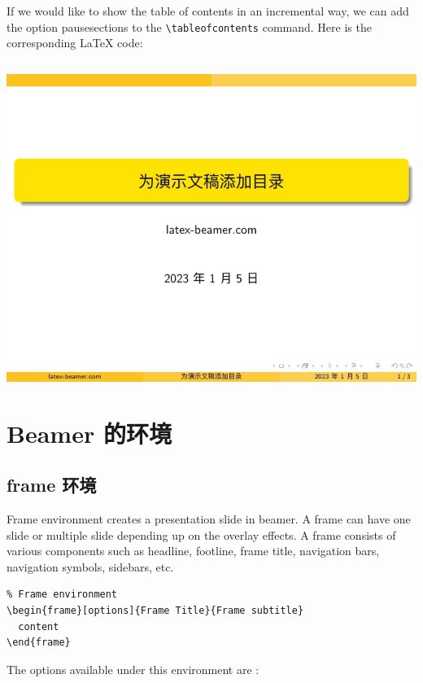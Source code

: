 If we would like to show the table of contents in an incremental way, we can add the option {\ttfamily pausesections} to the \verb|\tableofcontents| command. Here is the corresponding {\LaTeX} code:

\inputminted[linenos=true]{latex}{examples/beamer/beamertoc04.tex}

\includegraphics[page=2]{examples/beamer/beamertoc04.pdf}

\section{Beamer 的环境}

\subsection{{\ttfamily frame} 环境}

Frame environment creates a presentation slide in beamer. A frame can have one slide or multiple slide depending up on the overlay effects. A frame consists of various components such as headline, footline, frame title, navigation bars, navigation symbols, sidebars, etc. 

\begin{verbatim}
% Frame environment
\begin{frame}[options]{Frame Title}{Frame subtitle}
  content
\end{frame}
\end{verbatim}

The options available under this environment are :

